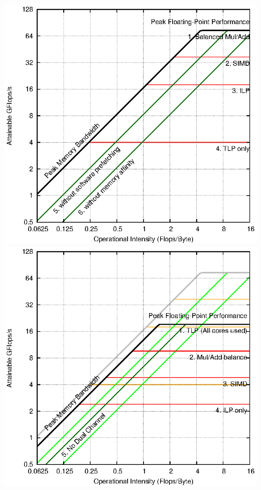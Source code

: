\documentclass{article}
\begin{document}
\begin{center}
\includegraphics{x4roofline.eps}
\includegraphics{joined.eps}
\end{center}
\end{document}
